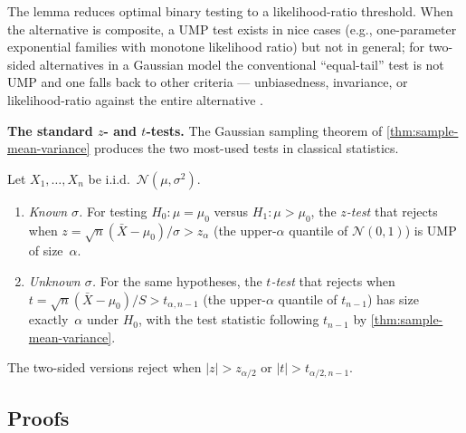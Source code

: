 \begin{remark}
The lemma reduces optimal binary testing to a likelihood-ratio
threshold. When the alternative is composite, a UMP test exists in
nice cases (e.g., one-parameter exponential families with monotone
likelihood ratio) but not in general; for two-sided alternatives
in a Gaussian model the conventional ``equal-tail'' test is not UMP
and one falls back to other criteria — unbiasedness, invariance,
or likelihood-ratio against the entire alternative
\cite[Ch.~VII]{Shiryaev1989}.
\end{remark}

\medskip
\noindent\textbf{The standard $z$- and $t$-tests.} The Gaussian
sampling theorem of \cref{thm:sample-mean-variance} produces the
two most-used tests in classical statistics.

\begin{proposition}
\label{prop:z-and-t-tests}
Let $X_1, \dots, X_n$ be i.i.d.\ $\mathcal{N}(\mu, \sigma^2)$.
\begin{enumerate}[label=(\alph*)]
  \item \emph{Known $\sigma$.} For testing $H_0 : \mu = \mu_0$
        versus $H_1 : \mu > \mu_0$, the \emph{$z$-test} that
        rejects when $z = \sqrt n (\bar X - \mu_0)/\sigma > z_\alpha$
        (the upper-$\alpha$ quantile of $\mathcal{N}(0, 1)$) is UMP
        of size~$\alpha$.
  \item \emph{Unknown $\sigma$.} For the same hypotheses, the
        \emph{$t$-test} that rejects when
        $t = \sqrt n (\bar X - \mu_0)/S > t_{\alpha, n - 1}$
        (the upper-$\alpha$ quantile of $t_{n - 1}$) has size
        exactly~$\alpha$ under $H_0$, with the test statistic
        following $t_{n - 1}$ by \cref{thm:sample-mean-variance}.
\end{enumerate}
The two-sided versions reject when $|z| > z_{\alpha/2}$ or
$|t| > t_{\alpha/2, n - 1}$.
\end{proposition}

\subsection*{Proofs}

